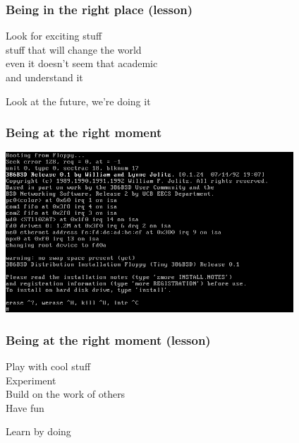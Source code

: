 \documentclass[17pt,aspectratio=169,hyperref=pdfusetitle]{beamer}
\begin{document}
\begin{frame}[fragile]
  \frametitle{Being in the right place (lesson)}

  Look for exciting stuff \\
  stuff that will change the world \\
  even it doesn't seem that academic \\
  and understand it \\

    \begin{center}
    Look at the future, we're doing it
    \end{center}

\end{frame}

\begin{frame}[fragile]
  \frametitle{Being at the right moment}

  \begin{center}
  \includegraphics[height=6cm]{figs/386BSD-installer}
  \end{center}  
  
\end{frame}

\begin{frame}[fragile]
  \frametitle{Being at the right moment (lesson)}

  Play with cool stuff \\
  Experiment \\
  Build on the work of others \\
  Have fun \\

  \begin{center}
    Learn by doing
  \end{center}
\end{frame}
\end{document}
